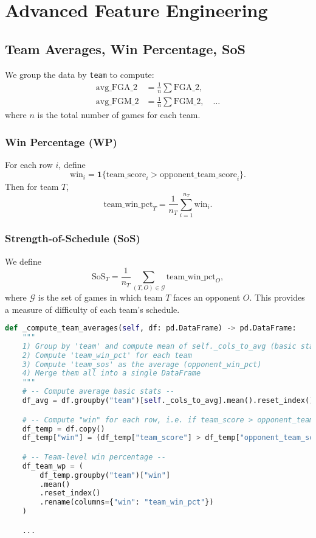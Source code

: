 \documentclass[12pt]{article}
\begin{document}
\section{Advanced Feature Engineering}

\subsection{Team Averages, Win Percentage, SoS}
We group the data by \texttt{team} to compute:
\begin{align*}
\text{avg\_FGA\_2} &= \frac{1}{n}\sum \text{FGA\_2}, \\
\text{avg\_FGM\_2} &= \frac{1}{n}\sum \text{FGM\_2}, \quad \ldots
\end{align*}
where \(n\) is the total number of games for each team.

\subsubsection{Win Percentage (WP)}
For each row \(i\), define
\[
\text{win}_i = \mathbf{1}\{ \text{team\_score}_i > \text{opponent\_team\_score}_i \}.
\]
Then for team \(T\),
\[
\text{team\_win\_pct}_T = \frac{1}{n_T} \sum_{i=1}^{n_T} \text{win}_i.
\]

\subsubsection{Strength-of-Schedule (SoS)}
We define
\[
\text{SoS}_T = \frac{1}{n_T} \sum_{(T, O) \in \mathcal{G}} \text{team\_win\_pct}_O,
\]
where \(\mathcal{G}\) is the set of games in which team \(T\) faces an opponent \(O\). This provides a measure of difficulty of each team’s schedule.

\begin{lstlisting}[language=Python]
def _compute_team_averages(self, df: pd.DataFrame) -> pd.DataFrame:
    """
    1) Group by 'team' and compute mean of self._cols_to_avg (basic stats)
    2) Compute 'team_win_pct' for each team
    3) Compute 'team_sos' as the average (opponent_win_pct)
    4) Merge them all into a single DataFrame
    """
    # -- Compute average basic stats --
    df_avg = df.groupby("team")[self._cols_to_avg].mean().reset_index()

    # -- Compute "win" for each row, i.e. if team_score > opponent_team_score --
    df_temp = df.copy()
    df_temp["win"] = (df_temp["team_score"] > df_temp["opponent_team_score"]).astype(int)

    # -- Team-level win percentage --
    df_team_wp = (
        df_temp.groupby("team")["win"]
        .mean()
        .reset_index()
        .rename(columns={"win": "team_win_pct"})
    )

    ...
\end{lstlisting}
\end{document}
